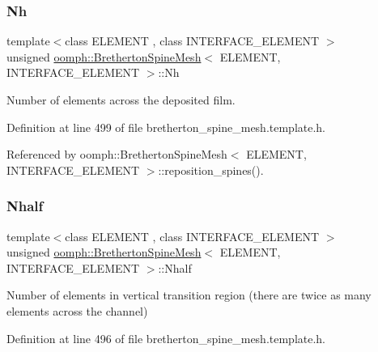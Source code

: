 \subsubsection{\texorpdfstring{Nh}{Nh}}
{\footnotesize\ttfamily template$<$class E\+L\+E\+M\+E\+NT , class I\+N\+T\+E\+R\+F\+A\+C\+E\+\_\+\+E\+L\+E\+M\+E\+NT $>$ \\
unsigned \hyperlink{classoomph_1_1BrethertonSpineMesh}{oomph\+::\+Bretherton\+Spine\+Mesh}$<$ E\+L\+E\+M\+E\+NT, I\+N\+T\+E\+R\+F\+A\+C\+E\+\_\+\+E\+L\+E\+M\+E\+NT $>$\+::Nh\hspace{0.3cm}{\ttfamily [protected]}}



Number of elements across the deposited film. 



Definition at line 499 of file bretherton\+\_\+spine\+\_\+mesh.\+template.\+h.



Referenced by oomph\+::\+Bretherton\+Spine\+Mesh$<$ E\+L\+E\+M\+E\+N\+T, I\+N\+T\+E\+R\+F\+A\+C\+E\+\_\+\+E\+L\+E\+M\+E\+N\+T $>$\+::reposition\+\_\+spines().

\mbox{\label{classoomph_1_1BrethertonSpineMesh_a1e58d18dd2231c785008efa07260e8da}} 
\subsubsection{\texorpdfstring{Nhalf}{Nhalf}}
{\footnotesize\ttfamily template$<$class E\+L\+E\+M\+E\+NT , class I\+N\+T\+E\+R\+F\+A\+C\+E\+\_\+\+E\+L\+E\+M\+E\+NT $>$ \\
unsigned \hyperlink{classoomph_1_1BrethertonSpineMesh}{oomph\+::\+Bretherton\+Spine\+Mesh}$<$ E\+L\+E\+M\+E\+NT, I\+N\+T\+E\+R\+F\+A\+C\+E\+\_\+\+E\+L\+E\+M\+E\+NT $>$\+::Nhalf\hspace{0.3cm}{\ttfamily [protected]}}



Number of elements in vertical transition region (there are twice as many elements across the channel) 



Definition at line 496 of file bretherton\+\_\+spine\+\_\+mesh.\+template.\+h.



